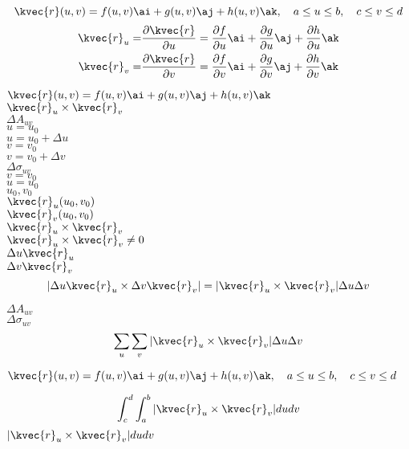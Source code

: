 \[\kvec{r}(u,v)=f(u,v)\ai+g(u,v)\aj+h(u,v)\ak, \quad a\le u\le b, \quad c\le v\le d\]
\begin{align*}
\kvec{r}_{u}=&\frac{\partial \kvec{r}}{\partial u}=\frac{\partial f }{\partial u}\ai+\frac{\partial g}{\partial u}\aj+\frac{\partial h}{\partial u}\ak\\
\kvec{r}_{v}=&\frac{\partial \kvec{r}}{\partial v}=\frac{\partial f}{\partial v}\ai+\frac{\partial g}{\partial v}\aj+\frac{\partial h }{\partial v}\ak
\end{align*}

\(\kvec{r}(u,v)=f(u,v)\ai+g(u,v)\aj+h(u,v)\ak\)\\
\(\kvec{r}_{u} \times\kvec{r}_{v}\)\\
\(\Delta A_{uv}\)\\
\(u=u_{0}\)\\
\(u=u_{0}+\Delta u\)\\
\(v=v_{0}\)\\
\(v=v_{0}+\Delta v\)\\
\(\Delta \sigma_{uv}\)\\
\(v=v_{0}\)\\
\(u=u_{0}\)\\
\(u_{0},v_{0}\)\\
\(\kvec{r}_{u}(u_{0},v_{0})\)\\
\(\kvec{r}_{v}(u_{0},v_{0})\)\\
\(\kvec{r}_{u} \times \kvec{r}_{v}\)\\
\(\kvec{r}_{u} \times \kvec{r}_{v}\neq 0\)\\
\(\Delta u\kvec{r}_{u}\)\\
\(\Delta v \kvec{r}_{v}\)\\
\begin{equation}
|\Delta u\kvec{r}_{u}\times \Delta v \kvec{r}_{v}|=|\kvec{r}_{u}\times \kvec{r}_{v}|\Delta u\Delta v
\end{equation}



\(\Delta A_{uv}\)\\
\(\Delta \sigma_{uv}\)
\begin{equation}
\sum_{u}\sum_{v}|\kvec{r}_{u}\times \kvec{r}_{v}|\Delta u\Delta v
\end{equation}

\(\kvec{r}(u,v)=f(u,v)\ai+g(u,v)\aj+h(u,v)\ak,\quad a \le u\le b,\quad  c \le v\le d\)

\begin{equation}
\int_{c}^{d}\int_{a}^{b}|\kvec{r}_{u}\times \kvec{r}_{v}|dudv
\end{equation}
\(|\kvec{r}_{u}\times \kvec{r}_{v}|dudv\)

